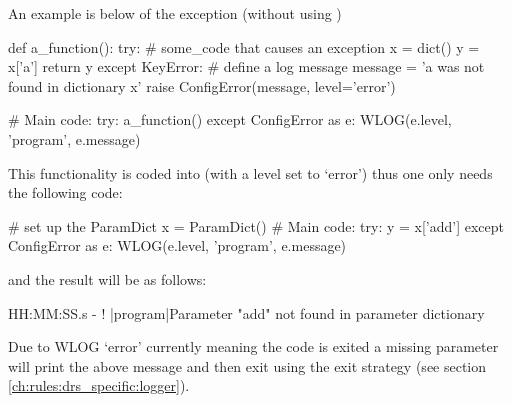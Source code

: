 An example is below of the \ConfigError exception (without using \ParamDict)

\begin{pythonbox}
def a_function():
    try:
        # some_code that causes an exception
        x = dict()
        y = x['a']
        return y
    except KeyError:
        # define a log message
        message = 'a was not found in dictionary x'
        raise ConfigError(message, level='error')

# Main code:
try:
    a_function()
except ConfigError as e:
    WLOG(e.level, 'program', e.message)
\end{pythonbox}
\vspace{0.5cm}
\noindent This functionality is coded into \ParamDict (with a \WLOG level set to `error') thus one only needs the following code:
\begin{pythonbox}
# set up the ParamDict
x = ParamDict()
# Main code:
try:
    y = x['add']
except ConfigError as e:
    WLOG(e.level, 'program', e.message)
\end{pythonbox}
\noindent and the result will be as follows:
\begin{cmdboxprint}
HH:MM:SS.s - ! |program|Parameter "add" not found in parameter dictionary
\end{cmdboxprint}
\begin{note}
Due to WLOG `error' currently meaning the code is exited a missing parameter will print the above message and then exit using the  exit strategy (see section \ref{ch:rules:drs_specific:logger}).
\end{note}